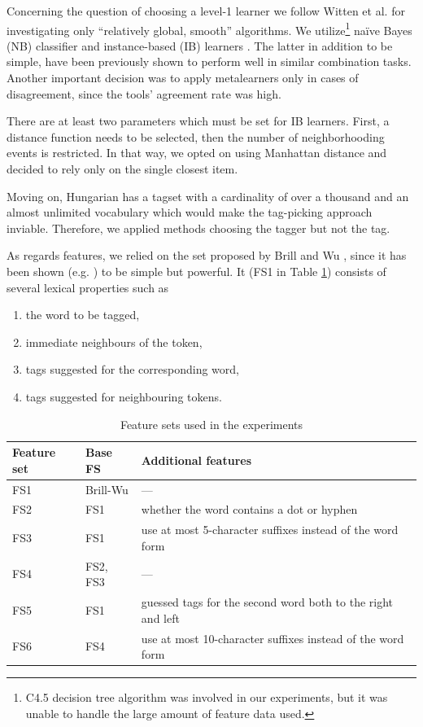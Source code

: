 Concerning the question of choosing a level-1 learner we follow Witten et al. \cite{Witten2011} for investigating only ``relatively global, smooth'' algorithms.
We utilize\footnote{ C4.5 decision tree algorithm was involved in our experiments, but it was unable to handle the large amount of feature data used.} naïve Bayes (NB) classifier and instance-based (IB) learners \cite{Aha1991}.
The latter in addition to be simple, have been previously shown to perform well in similar combination tasks.
Another important decision was to apply metalearners only in cases of disagreement, since the tools’ agreement rate was high.

There are at least two parameters which must be set for IB learners.
First, a distance function needs to be selected, then the number of neighborhooding events is restricted.
In that way, we opted on using Manhattan distance and decided to rely only on the single closest item. 

Moving on, Hungarian has a tagset with a cardinality of over a thousand and an almost unlimited vocabulary which would make the tag-picking approach inviable. Therefore, we applied methods choosing the tagger but not the tag. 

As regards features, we relied on the set proposed by Brill and Wu \cite{Brill1998}, since it has been shown (e.g. \cite{Halteren2001}) to be simple but powerful. It (FS1 in Table \ref{tab:comb-feature-sets}) consists of several lexical properties such as
\begin{enumerate}
 \item the word to be tagged, 
 \item immediate neighbours of the token,
 \item tags suggested for the corresponding word,
 \item tags suggested for neighbouring tokens.
\end{enumerate}

\begin{table}[h]
\centering
\caption{Feature sets used in the experiments}\label{tab:comb-feature-sets}
\begin{tabular}{l l l}
\hline
Feature set & Base FS & Additional features \\
\hline
FS1 & Brill-Wu & --- \\
FS2 & FS1 & whether the word contains a dot or hyphen \\
FS3 & FS1 & use at most 5-character suffixes instead of the word form \\
FS4 & FS2, FS3 & --- \\ 
FS5 & FS1 & guessed tags for the second word both to the right and left \\
FS6 & FS4 & use at most 10-character suffixes instead of the word form \\
\hline
\end{tabular}
\end{table}

